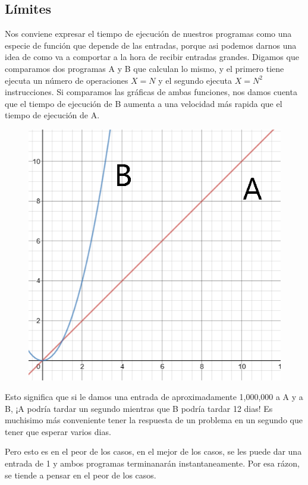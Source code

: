 \documentclass{article}
\begin{document}
\subsection{Límites}

Nos conviene expresar el tiempo de ejecución de nuestros programas como una especie de función que depende de las entradas, porque asi podemos darnos una idea de como va a comportar a la hora de recibir entradas grandes. Digamos que comparamos dos programas A y B que calculan lo mismo, y el primero tiene ejecuta un número de operaciones $X = N$ y el segundo ejecuta $X = N^2$ instrucciones. Si comparamos las gráficas de ambas funciones, nos damos cuenta que el tiempo de ejecución de B aumenta a una velocidad más rapida que el tiempo de ejecución de A.

\begin{figure}[H]
    \centering
    \includegraphics[width=0.3\paperwidth]{nsquared}
\end{figure}

Esto significa que si le damos una entrada de aproximadamente 1,000,000 a A y a B, ¡A podría tardar un segundo mientras que B podría tardar 12 dias! Es muchisimo más conveniente tener la respuesta de un problema en un segundo que tener que esperar varios dias.

Pero esto es en el peor de los casos, en el mejor de los casos, se les puede dar una entrada de 1 y ambos programas terminanarán instantaneamente. Por esa rázon, se tiende a pensar en el peor de los casos.
\end{document}

